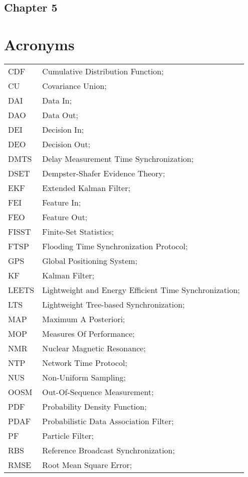 \subsection*{Chapter 5}

\newpage
\section*{Acronyms}
\begin{longtable}{ll}
	CDF			& Cumulative Distribution Function; \\
	CU			& Covariance Union; \\
	DAI			& Data In; \\
	DAO			& Data Out; \\
	DEI			& Decision In; \\
	DEO 		& Decision Out; \\
	DMTS		& Delay Measurement Time Synchronization; \\
	DSET 		& Dempster-Shafer Evidence Theory; \\		
	EKF			& Extended Kalman Filter; \\
	FEI			& Feature In; \\
	FEO			& Feature Out; \\
	FISST		& Finite-Set Statistics; \\
	FTSP		& Flooding Time Synchronization Protocol; \\
	GPS			& Global Positioning System; \\
	KF 			& Kalman Filter; \\
	LEETS		& Lightweight and Energy Efficient Time Synchronization; \\
	LTS			& Lightweight Tree-based Synchronization; \\
	MAP			& Maximum A Posteriori; \\
	MOP 		& Measures Of Performance; \\
	NMR 		& Nuclear Magnetic Resonance; \\
	NTP			& Network Time Protocol; \\
	NUS 		& Non-Uniform Sampling; \\ 
	OOSM 		& Out-Of-Sequence Measurement; \\
	PDF         & Probability Density Function; \\
	PDAF		& Probabilistic Data Association Filter; \\
	PF 			& Particle Filter; \\
	RBS			& Reference Broadcast Synchronization; \\
	RMSE		& Root Mean Square Error; \\

\end{longtable}
